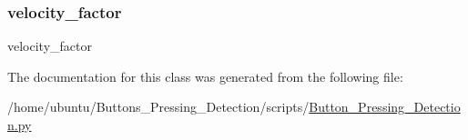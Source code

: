 \subsubsection{\texorpdfstring{velocity\+\_\+factor}{velocity\_factor}}
{\footnotesize\ttfamily velocity\+\_\+factor}



The documentation for this class was generated from the following file\+:\begin{DoxyCompactItemize}
\item 
/home/ubuntu/\+Buttons\+\_\+\+Pressing\+\_\+\+Detection/scripts/\hyperlink{a00002}{Button\+\_\+\+Pressing\+\_\+\+Detection.\+py}\end{DoxyCompactItemize}
